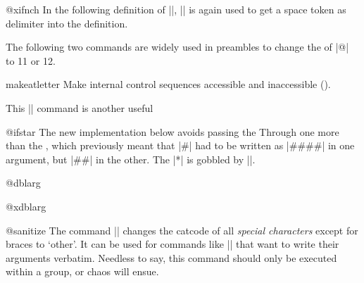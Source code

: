 %
\begin{docCommand}{@xifnch}{}
    In the following definition of |\@xifnch|, |\:| is again used
    to get a space token as delimiter into the definition.
\begin{teX}
\def\:{\@xifnch} \expandafter\def\: {\futurelet\@let@token\@ifnch}
\end{teX}
\end{docCommand}

The following two commands are widely used in preambles to change the  of |@| to 11 or 12.

\begin{docCommand}{makeatletter}{}
Make internal control sequences accessible and inaccessible ().
\begin{teX}
\def\makeatletter{\catcode`\@11\relax}
\def\makeatother{\catcode`\@12\relax}
\end{teX}
\end{docCommand}


This |\@ifstar| command is another useful 
\begin{docCommand}{@ifstar} { }
 The new implementation below avoids passing the 
 Through one more  than the , which previously
 meant that |#| had to be written as |####| in one argument, but |##|
 in the other. The |*| is gobbled by |\@firstoftwo|.
\begin{teX}
\def\@ifstar#1{\@ifnextchar *{\@firstoftwo{#1}}}
\end{teX}
\end{docCommand}

\begin{docCommand}{@dblarg}{}
\begin{docCommand}{@xdblarg}{}

\begin{teX}
\long\def\@dblarg#1{\kernel@ifnextchar[{#1}{\@xdblarg{#1}}}
\long{}
\end{teX}
\end{docCommand}
\end{docCommand}
%

\begin{docCommand}{@sanitize}{}
 The command |\@sanitize| changes the catcode of all \emph{special characters}
 except for braces to `other'.  It can be used for commands like
 |\index| that want to write their arguments verbatim.  Needless to
 say, this command should only be executed within a group, or chaos
 will ensue.
\end{docCommand}

